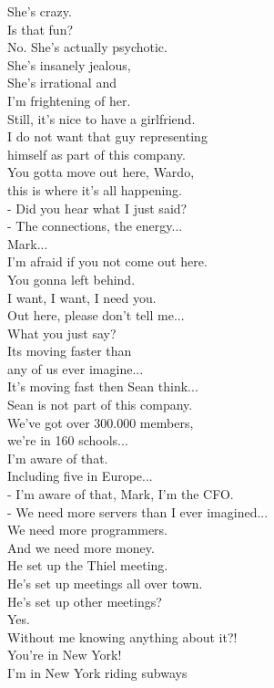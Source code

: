 \documentclass{article}
\begin{document}
\begin{multicols}{3}
She's crazy.\\
Is that fun?\\
No. She's actually psychotic.\\
She's insanely jealous,\\
She's irrational and\\
I'm frightening of her.\\
Still, it's nice to have a girlfriend.\\
I do not want that guy representing\\
himself as part of this company.\\
You gotta move out here, Wardo,\\
this is where it's all happening.\\
- Did you hear what I just said?\\
- The connections, the energy...\\
Mark...\\
I'm afraid if you not come out here.\\
You gonna left behind.\\
I want, I want, I need you.\\
Out here, please don't tell me...\\
What you just say?\\
Its moving faster than\\
any of us ever imagine...\\
It's moving fast then Sean think...\\
Sean is not part of this company.\\
We've got over 300.000 members,\\
we're in 160 schools...\\
I'm aware of that.\\
Including five in Europe...\\
- I'm aware of that, Mark, I'm the CFO.\\
- We need more servers than I ever imagined...\\
We need more programmers.\\
And we need more money.\\
He set up the Thiel meeting.\\
He's set up meetings all over town.\\
He's set up other meetings?\\
Yes.\\
Without me knowing anything about it?!\\
You're in New York!\\
I'm in New York riding subways\\

\end{multicols}
\end{document}

